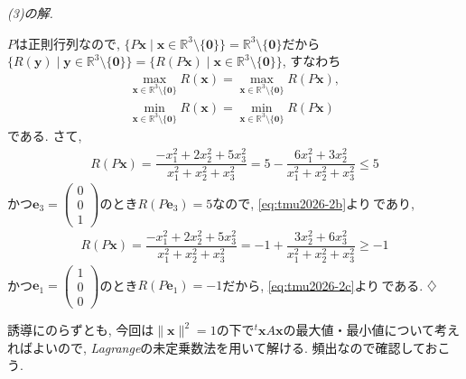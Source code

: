\documentclass[titlepage]{jsarticle}
\numberwithin{equation}{section}
\newcommand{\R}{\mathbb{R}}%
\newenvironment{kaitou}[1][解]{%
\begin{proofbox}%
\textit{#1. }\ignorespaces
}{%
\hfill$\diamondsuit$%
\end{proofbox}%
}
\begin{document}
\begin{kaitou}[(3)の解]
$P$は正則行列なので, $\{P\bm{x}\mid \bm{x}\in \R^3\setminus\{\bm{0}\}\} = \R^3\setminus\{\bm{0}\}$だから$\{R(\bm{y})\mid \bm{y} \in \R^3 \setminus \{\bm{0}\}\} = \{R(P\bm{x}) \mid \bm{x}\in \R^3 \setminus \{\bm{0}\}\}$, すなわち
\begin{align}
\max_{\bm{x}\in\R^3\setminus\{\bm{0}\}} R(\bm{x}) = \max_{\bm{x}\in\R^3\setminus\{\bm{0}\}} R(P\bm{x}), \label{eq:tmu2026-2b}\\
\min_{\bm{x}\in\R^3\setminus\{\bm{0}\}} R(\bm{x}) = \min_{\bm{x}\in\R^3\setminus\{\bm{0}\}} R(P\bm{x}) \label{eq:tmu2026-2c}
\end{align}
である. さて, 
\begin{align*}
R(P\bm{x}) = \dfrac{-x_1^2 + 2x_2^2 + 5x_3^2}{x_1^2 + x_2^2 +  x_3^2} = 5 - \dfrac{6x_1^2 + 3x_2^2}{x_1^2 + x_2^2 +  x_3^2} \le 5
\end{align*}
かつ$\bm{e}_3 = 
\displaystyle{
\begin{pmatrix}
0\\
0\\
1
\end{pmatrix}
}$のとき$R(P\bm{e}_3) = 5$なので, \eqref{eq:tmu2026-2b}より\,であり, 
\begin{align*}
R(P\bm{x}) = \dfrac{-x_1^2 + 2x_2^2 + 5x_3^2}{x_1^2 + x_2^2 +  x_3^2} = -1 + \dfrac{3x_2^2 + 6x_3^2}{x_1^2 + x_2^2 +  x_3^2} \ge -1
\end{align*}
かつ$\bm{e}_1 = 
\begin{pmatrix}
1\\
0\\
0
\end{pmatrix}
$のとき$R(P\bm{e}_1) = -1$だから, \eqref{eq:tmu2026-2c}より\,である.
\end{kaitou}
誘導にのらずとも, 今回は$\|\bm{x}\|^2 = 1$の下で${}^t\bm{x}A\bm{x}$の最大値・最小値について考えればよいので, \textit{Lagrange}の未定乗数法を用いて解ける. 頻出なので確認しておこう.
\end{document}
